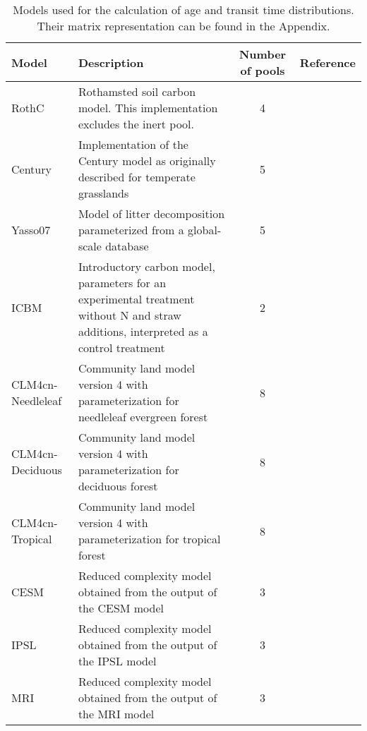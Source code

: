 \documentclass[draft,linenumbers]{agujournal}
\begin{document}
\begin{table}[htbp]
   \centering
   \caption{Models used for the calculation of age and transit time distributions. Their matrix representation can be found in the Appendix.} \label{tab:models}
   \begin{tabular}{lp{5cm}cp{2cm}} %
      \toprule
      Model    & Description & Number of pools & Reference \\
      \midrule
      RothC      & Rothamsted soil carbon model. This implementation excludes the inert pool. & 4 & \citet{Jenkinson1990} \\
      Century & Implementation of the Century model as originally described for temperate grasslands & 5 & \citet{Parton1987}  \\ 
      Yasso07 & Model of litter decomposition parameterized from a global-scale database & 5 & \citet{Tuomi2009}  \\ 
      ICBM & Introductory carbon model, parameters for an experimental treatment without N and straw additions, interpreted as a control treatment & 2 & \citet{Andren1997}  \\ 
      CLM4cn-Needleleaf & Community land model version 4 with parameterization for needleleaf evergreen forest & 8 & \citet{Wieder2014}  \\ 
      CLM4cn-Deciduous & Community land model version 4 with parameterization for deciduous forest & 8 & \citet{Wieder2014}  \\ 
      CLM4cn-Tropical & Community land model version 4 with parameterization for tropical forest & 8 & \citet{Wieder2014}  \\ 
      CESM & Reduced complexity model obtained from the output of the CESM model & 3 & \citet{He2016}  \\ 
      IPSL & Reduced complexity model obtained from the output of the IPSL model & 3 & \citet{He2016}  \\ 
      MRI & Reduced complexity model obtained from the output of the MRI model & 3 & \citet{He2016}  \\ 
      \bottomrule
   \end{tabular}
\end{table}



\end{document}
